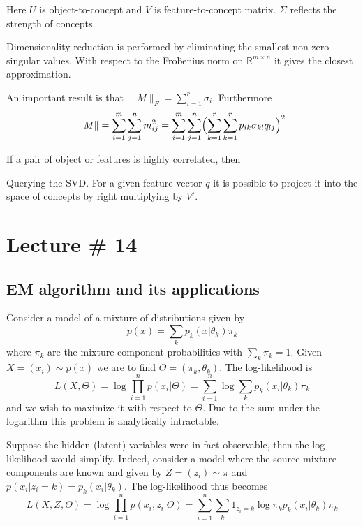 \documentclass[a4paper]{article}
\newcommand{\Real}{\mathbb{R}}
\begin{document}
Here $U$ is object-to-concept and $V$ is feature-to-concept matrix. $\Sigma$ reflects
the strength of concepts.

Dimensionality reduction is performed by eliminating the smallest non-zero singular
values. With respect to the Fro\"benius norm on $\Real^{m\times n}$ it gives the
closest approximation.

An important result is that $\|M\|_F = \sum_{i=1}^r \sigma_i$. Furthermore
\[
\|M\|
= \sum_{i=1}^m \sum_{j=1}^n m_{ij}^2
= \sum_{i=1}^m \sum_{j=1}^n \Bigl( \sum_{k=1}^r \sum_{k=1}^r p_{ik}\sigma_{kl}q_{lj} \Bigr)^2
\]

If a pair of object or features is highly correlated, then 

Querying the SVD. For a given feature vector $q$ it is possible to project it into
the space of concepts by right multiplying by $V'$.



\section{Lecture \# 14} %
\label{sec:lecture_14}

\subsection{EM algorithm and its applications} %
\label{sub:em_algorithm_and_its_applications}

Consider a model of a mixture of distributions given by
\[p(x) = \sum_k p_k(x|\theta_k) \pi_k \]
where $\pi_k$ are the mixture component probabilities with $\sum_k \pi_k = 1$.
Given $X = (x_i)\sim p(x)$ we are to find $\Theta = (\pi_k,\theta_k)$.
The log-likelihood is
\[
L(X, \Theta)
= \log \prod_{i=1}^n p( x_i | \Theta )
= \sum_{i=1}^n \log \sum_k p_k(x_i|\theta_k) \pi_k
\]
and we wish to maximize it with respect to $\Theta$. Due to the sum under the
logarithm this problem is analytically intractable.

Suppose the hidden (latent) variables were in fact observable, then the log-likelihood
would simplify. Indeed, consider a model where the source mixture components are known
and given by $Z=(z_i)\sim \pi$ and $p(x_i|z_i = k) = p_k(x_i|\theta_k)$. The log-likelihood
thus becomes
\[
L(X,Z,\Theta)
= \log \prod_{i=1}^n p( x_i, z_i| \Theta )
= \sum_{i=1}^n \sum_k 1_{z_i=k} \log \pi_k p_k(x_i|\theta_k) \pi_k
\]
\end{document}
